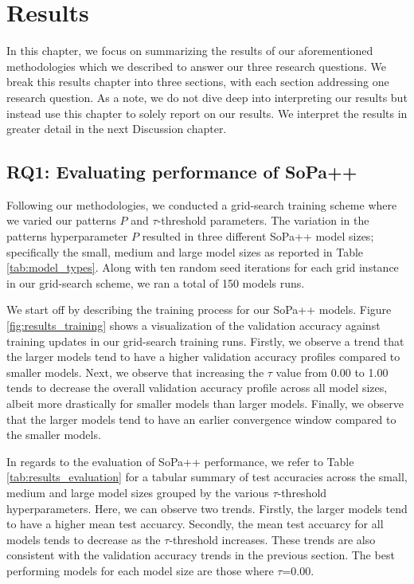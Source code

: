 \chapter{Results}

\label{chapter:results}

In this chapter, we focus on summarizing the results of our aforementioned
methodologies which we described to answer our three research questions. We
break this results chapter into three sections, with each section addressing one
research question. As a note, we do not dive deep into interpreting our results
but instead use this chapter to solely report on our results. We interpret the
results in greater detail in the next Discussion chapter.

\section{RQ1: Evaluating performance of SoPa++}

Following our methodologies, we conducted a grid-search training scheme where we
varied our patterns $P$ and $\tau$-threshold parameters. The variation in the
patterns hyperparameter $P$ resulted in three different SoPa++ model sizes;
specifically the small, medium and large model sizes as reported in Table
\ref{tab:model_types}. Along with ten random seed iterations for each grid
instance in our grid-search scheme, we ran a total of 150 models runs.

We start off by describing the training process for our SoPa++ models. Figure
\ref{fig:results_training} shows a visualization of the validation accuracy
against training updates in our grid-search training runs. Firstly, we
observe a trend that the larger models tend to have a higher validation accuracy
profiles compared to smaller models. Next, we observe that increasing the
$\tau$ value from 0.00 to 1.00 tends to decrease the overall validation accuracy
profile across all model sizes, albeit more drastically for smaller models than
larger models. Finally, we observe that the larger models tend to have an
earlier convergence window compared to the smaller models.

In regards to the evaluation of SoPa++ performance, we refer to Table
\ref{tab:results_evaluation} for a tabular summary of test accuracies across the
small, medium and large model sizes grouped by the various $\tau$-threshold
hyperparameters. Here, we can observe two trends. Firstly, the larger models
tend to have a higher mean test accuarcy. Secondly, the mean test accuarcy for
all models tends to decrease as the $\tau$-threshold increases. These trends are
also consistent with the validation accuracy trends in the previous section. The
best performing models for each model size are those where $\tau$=0.00.

